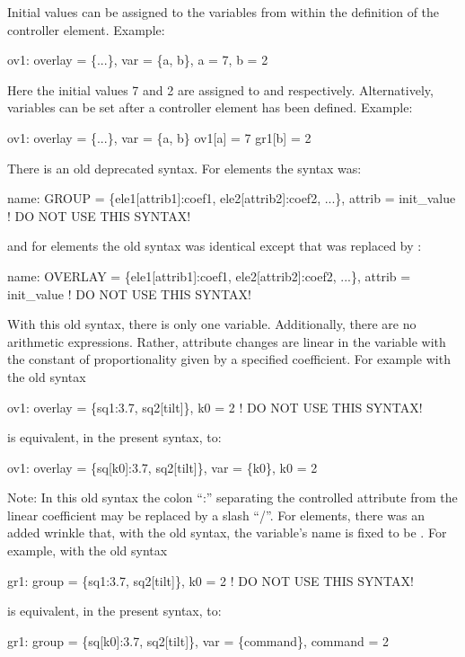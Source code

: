 Initial values can be assigned to the variables from within the
definition of the controller element. Example:
\begin{example}
  ov1: overlay = \{...\}, var = \{a, b\}, a = 7, b = 2
\end{example}
Here the initial values 7 and 2 are assigned to  and  respectively.
Alternatively, variables can be set after a controller element has been defined. 
Example:
\begin{example}
  ov1: overlay = \{...\}, var = \{a, b\}
  ov1[a] = 7
  gr1[b] = 2
\end{example}

There is an old deprecated syntax. For  elements the syntax was:
\begin{example}
  name: GROUP = \{ele1[attrib1]:coef1, ele2[attrib2]:coef2, ...\}, 
                       attrib = init_value  ! DO NOT USE THIS SYNTAX!
\end{example}
and for  elements the old syntax was identical except
that  was replaced by :
\begin{example}
  name: OVERLAY = \{ele1[attrib1]:coef1, ele2[attrib2]:coef2, ...\}, 
                       attrib = init_value  ! DO NOT USE THIS SYNTAX!
\end{example}

With this old syntax, there is only one variable. Additionally, there
are no arithmetic expressions. Rather, attribute changes are linear in
the  variable with the constant of proportionality given
by a specified coefficient. For example with the old syntax
\begin{example}
  ov1: overlay = \{sq1:3.7, sq2[tilt]\}, k0 = 2  ! DO NOT USE THIS SYNTAX!
\end{example}
is equivalent, in the present syntax, to:
\begin{example}
  ov1: overlay = \{sq[k0]:3.7, sq2[tilt]\}, var = \{k0\}, k0 = 2  
\end{example}
Note: In this old syntax the colon ``:'' separating the controlled
attribute from the linear coefficient may be replaced by a slash
``/''.  For  elements, there was an added wrinkle that, with
the old syntax, the variable's name is fixed to be . For
example, with the old syntax
\begin{example}
  gr1: group = \{sq1:3.7, sq2[tilt]\}, k0 = 2  ! DO NOT USE THIS SYNTAX!
\end{example}
is equivalent, in the present syntax, to:
\begin{example}
  gr1: group = \{sq[k0]:3.7, sq2[tilt]\}, var = \{command\}, command = 2  
\end{example}

